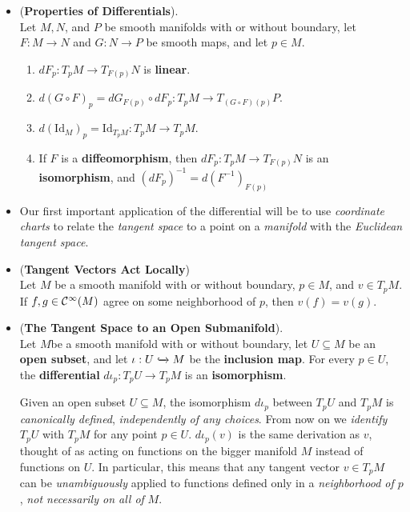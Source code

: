 \documentclass[11pt]{article}
\begin{document}
\begin{itemize}
\item \begin{proposition}\label{prop: diff_properties} (\textbf{Properties of Differentials}).\\
Let $M, N$, and $P$ be smooth manifolds with or without boundary, let $F: M \rightarrow N$ and $G: N \rightarrow P$ be smooth maps, and let $p \in M$.
\begin{enumerate}
\item $dF_{p}: T_{p}M \rightarrow T_{F(p)}N$ is \textbf{linear}.
\item $d(G \circ F)_{p} = dG_{F(p)} \circ dF_{p}: T_{p}M \rightarrow T_{(G \circ F)(p)}P$.
\item $d(\text{Id}_{M})_{p} = \text{Id}_{T_{p}M}: T_{p}M \rightarrow T_{p}M$.
\item If $F$ is a \textbf{diffeomorphism}, then $dF_{p}: T_{p}M \rightarrow T_{F(p)}N$ is an \textbf{isomorphism}, and
$(dF_{p})^{-1} = d(F^{-1})_{F(p)}$
\end{enumerate}
\end{proposition}

\item Our first important application of the differential will be to use \emph{coordinate charts} to relate the \emph{tangent space} to a point on a \emph{manifold} with the \emph{Euclidean tangent space}.

\item \begin{proposition} (\textbf{Tangent Vectors Act Locally})\\
Let $M$ be a smooth manifold with or without boundary, $p \in M$, and $v \in T_{p}M$. If $f, g \in {\mathcal C}^{\infty}(M)$ agree on some neighborhood of $p$, then $v(f) = v(g)$.
\end{proposition}

\item \begin{proposition}\label{prop: tangent_open_subman} (\textbf{The Tangent Space to an Open Submanifold}). \\
Let $M $be a smooth manifold with or without boundary, let $U \subseteq M$ be an \textbf{open subset}, and let $\iota: U \xhookrightarrow{} M$ be the \textbf{inclusion map}. For every $p \in U$, the \textbf{differential} $d\iota_{p}: T_{p}U \rightarrow T_{p}M$ is an \textbf{isomorphism}.
\end{proposition}

Given an open subset $U \subseteq M$, the isomorphism $d\iota_{p}$ between $T_{p}U$ and $T_{p}M$ is \emph{canonically defined}, \emph{independently of any choices}. From now on we \emph{identify} $T_{p}U$ with $T_{p}M$ for any point $p \in U$. $d\iota_{p}(v)$ is the same derivation as $v$, thought of as acting on functions on the bigger manifold $M$ instead of functions on $U$. In particular, this means that any tangent vector $v \in T_{p}M$ can be \emph{unambiguously} applied to functions defined only in a \emph{neighborhood of $p$}, \emph{not necessarily on all of} $M$.


\end{itemize}
\end{document}
